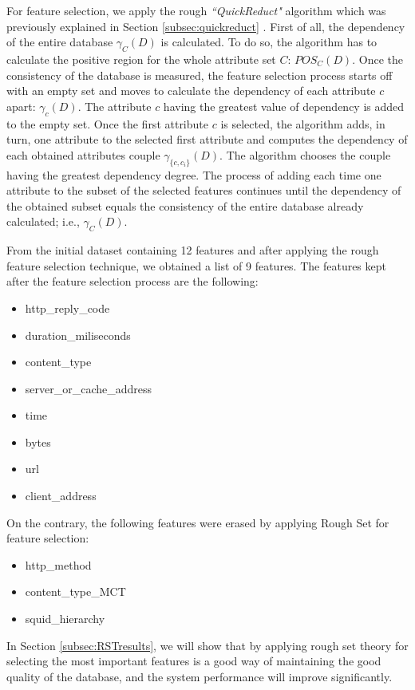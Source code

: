 \documentclass{llncs}
\begin{document}
For feature selection, we apply the rough \emph{``QuickReduct"} algorithm which was previously explained in Section \ref{subsec:quickreduct} . First of all, the dependency of the entire database $\gamma_{C}(D)$ is calculated. To do so, the algorithm has to calculate the positive region for the whole attribute set $C$: $POS_{C}(D)$. Once the consistency of the database is measured, the feature selection process starts off with an empty set and moves to calculate the dependency of each attribute $c$ apart: $\gamma_{c}(D)$. The attribute $c$ having the greatest value of dependency is added to the empty set. Once the first attribute $c$ is selected, the algorithm adds, in turn, one attribute to the selected first attribute and computes the dependency of each obtained attributes couple $\gamma_{\{c, c_{i}\}}(D)$. The algorithm chooses the couple having the greatest dependency degree. The process of adding each time one attribute to the subset of the selected features continues until the dependency of the obtained subset equals the consistency of the entire database already calculated; i.e., $\gamma_{C}(D)$.

From the initial dataset containing 12 features and after applying the rough feature selection technique, we obtained a list of 9 features. The features kept after the feature selection process are the following:

\begin{itemize}
  \item http\_reply\_code
  \item duration\_miliseconds
  \item content\_type
  \item server\_or\_cache\_address
  \item time
  \item bytes
  \item url
  \item client\_address
\end{itemize}

On the contrary, the following features were erased by applying Rough Set for feature selection:

\begin{itemize}
  \item http\_method
  \item content\_type\_MCT
  \item squid\_hierarchy
\end{itemize}

In Section \ref{subsec:RSTresults}, we will show that by applying rough set theory for selecting the most important features is a good way of maintaining the good quality of the database, and the system performance will improve significantly.
\end{document}
